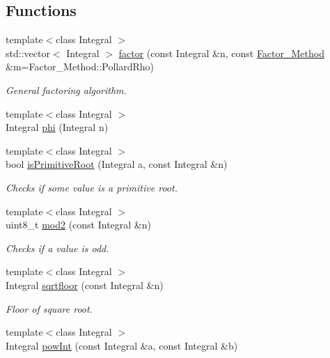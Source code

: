 \subsection*{Functions}
\begin{DoxyCompactItemize}
\item 
{\footnotesize template$<$class Integral $>$ }\\std\+::vector$<$ Integral $>$ \hyperlink{namespacecryptomath_a8efd5be118d0ab42b0c13ed237010f4d}{factor} (const Integral \&n, const \hyperlink{namespacecryptomath_a66e56d7b478803e17352ef017eb1264b}{Factor\+\_\+\+Method} \&m=Factor\+\_\+\+Method\+::\+Pollard\+Rho)
\begin{DoxyCompactList}\small\item\em General factoring algorithm. \end{DoxyCompactList}\item 
{\footnotesize template$<$class Integral $>$ }\\Integral \hyperlink{namespacecryptomath_a89a47b8e8f73c44552d629e8b599df4a}{phi} (Integral n)
\item 
{\footnotesize template$<$class Integral $>$ }\\bool \hyperlink{namespacecryptomath_ade4d38bdd977cca7686b73b516d1edde}{is\+Primitive\+Root} (Integral a, const Integral \&n)
\begin{DoxyCompactList}\small\item\em Checks if some value is a primitive root. \end{DoxyCompactList}\item 
{\footnotesize template$<$class Integral $>$ }\\uint8\+\_\+t \hyperlink{namespacecryptomath_abdfca9e5adf3b3660fcd8fcf94f116e6}{mod2} (const Integral \&n)
\begin{DoxyCompactList}\small\item\em Checks if a value is odd. \end{DoxyCompactList}\item 
{\footnotesize template$<$class Integral $>$ }\\Integral \hyperlink{namespacecryptomath_a9e16705865a198f4d3b0227619a85596}{sqrtfloor} (const Integral \&n)
\begin{DoxyCompactList}\small\item\em Floor of square root. \end{DoxyCompactList}\item 
{\footnotesize template$<$class Integral $>$ }\\Integral \hyperlink{namespacecryptomath_ad0bcf1b0015f3f35ed982614b9faee7e}{pow\+Int} (const Integral \&a, const Integral \&b)

\end{DoxyCompactItemize}
